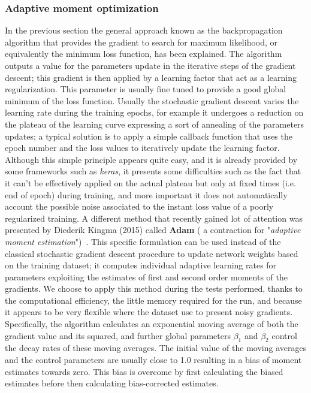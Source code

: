 \subsubsection{Adaptive moment optimization}
In the previous section the general approach known as the backpropagation algorithm that provides the gradient to search for maximum likelihood, or equivalently the minimum loss function, has been explained. 
The algorithm outputs a value for the parameters update in the iterative steps of the gradient descent; this gradient is then applied by a learning factor that act as a learning regularization. This parameter is usually fine tuned to provide a good global minimum of the loss function.
Usually the stochastic gradient descent varies the learning rate during the training epochs, for example it undergoes a reduction on the plateau of the learning curve expressing a sort of annealing of the parameters updates; a typical solution is to apply a simple callback function that uses the epoch number and the loss values to iteratively update the learning factor.
Although this simple principle appears quite easy, and it is already provided by some frameworks such as \textit{keras}, it presents some difficulties such as the fact that it can't be effectively applied on the actual plateau but only at fixed times (i.e. end of epoch) during training, and more important it does not automatically account the possible noise associated to the instant loss value of a poorly regularized training.
A different method that recently gained lot of attention was presented by Diederik Kingma (2015) called \textbf{Adam} ( a contraction for "\textit{adaptive moment estimation}")~\cite{kingma2014adam}. This specific formulation can be used instead of the classical stochastic gradient descent procedure to update network weights based on the training dataset; it computes individual adaptive learning rates for parameters exploiting the estimates of first and second order moments of the gradients. 
We choose to apply this method during the tests performed, thanks to the computational efficiency, the little memory required for the run, and because it appears to be very flexible where the dataset use to present noisy gradients.
Specifically, the algorithm calculates an exponential moving average of both the gradient value and its squared, and further global parameters $\beta_1$ and $\beta_2$ control the decay rates of these moving averages. 
The initial value of the moving averages and the control parameters are usually close to 1.0 resulting in a bias of moment estimates towards zero. This bias is overcome by first calculating the biased estimates before then calculating bias-corrected estimates.
